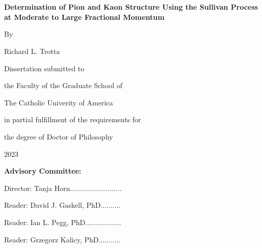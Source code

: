 \chapter[Certificate]{\label{Certificate}}

\begin{center}
  {\Large\bfseries Determination of Pion and Kaon Structure Using the Sullivan Process at Moderate to Large Fractional Momentum\par}
  \vspace{2cm}
  {By\par}
  {Richard L. Trotta\par}
  \vspace{2cm}
  {Dissertation submitted to\par
    the Faculty of the Graduate School of\par
    The Catholic Univerity of America\par
    in partial fulfillment of the requirements for\par
    the degree of Doctor of Philosophy\par}
  {2023}
\end{center}


\vfill
{\bfseries Advisory Committee:\par}
{\hspace{10mm}Director: Tanja Horn..........................\hrulefill\par}
{\hspace{10mm}Reader: David J. Gaskell, PhD..........\hrulefill\par}
{\hspace{10mm}Reader: Ian L. Pegg, PhD..................\hrulefill\par}
{\hspace{10mm}Reader: Grzegorz Kalicy, PhD...........\hrulefill\par}